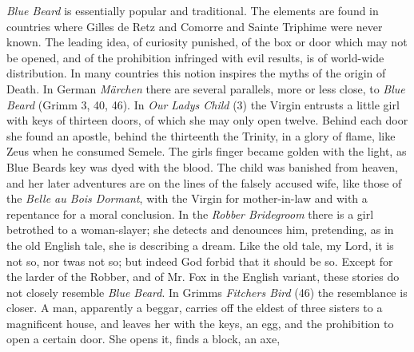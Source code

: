 \documentclass[14pt,a4paper]{memoir}
\begin{document}
{\emph{Blue Beard} is essentially popular and traditional. The elements
are found in countries where Gilles de Retz and Comorre and Sainte
Triphime were never known. The leading idea, of curiosity punished, of
the box or door which may not be opened, and of the prohibition
infringed with evil results, is of world-wide distribution. In many
countries this notion inspires the myths of the origin of
Death.
In German \emph{Märchen} there are several parallels, more or less
close, to \emph{Blue Beard} (Grimm 3, 40, 46). In \emph{Our
Lady\textquotesingle s Child} (3) the Virgin entrusts a little girl with
keys of thirteen doors, of which she may only open twelve. Behind each
door she found an apostle, behind the thirteenth the Trinity, in a glory
of flame, like Zeus when he consumed Semele. The girl\textquotesingle s
finger became golden with the light, as Blue Beard\textquotesingle s key
was dyed with the blood. The child was banished from heaven, and her
later adventures are on the lines of the falsely accused wife, like
those of the \emph{Belle au Bois Dormant}, with the Virgin for
mother-in-law and with a repentance for a moral conclusion. In the
\emph{Robber Bridegroom} there is a girl betrothed to a woman-slayer;
she detects and denounces him, pretending, as in the old English tale,
she is describing a dream. \textquotesingle Like the old tale, my Lord,
it is not so, nor \textquotesingle twas not so; but indeed God forbid
that it should be
so.\textquotesingle{}
Except for the \textquotesingle larder\textquotesingle{} of the Robber,
and of Mr. Fox in the English variant, these stories do not closely
resemble \emph{Blue Beard}. In Grimm\textquotesingle s
\emph{Fitcher\textquotesingle s Bird} (46) the resemblance is closer. A
man, apparently a beggar, carries off the eldest of three sisters to a
magnificent house, and leaves her with the keys, an egg, and the
prohibition to open a certain door. She opens it, finds a block, an axe,
}
\end{document}

